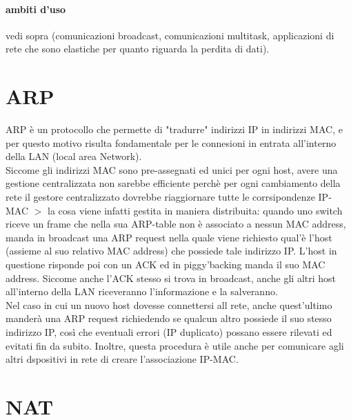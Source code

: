 \documentclass{article}
\begin{document}
\paragraph{ambiti d'uso} vedi sopra (comunicazioni broadcast, comunicazioni
multitask, applicazioni di rete che sono elastiche per quanto riguarda la
perdita di dati).

\section{ARP}
ARP è un protocollo che permette di "tradurre" indirizzi IP in indirizzi MAC, e
per questo motivo risulta fondamentale per le connesioni in entrata all'interno
della LAN (local area Network).\\
Siccome gli indirizzi MAC sono pre-assegnati ed unici per ogni host, avere una
gestione centralizzata non sarebbe efficiente perchè per ogni cambiamento della
rete il gestore centralizzato dovrebbe riaggiornare tutte le corrsipondenze
IP-MAC $>$ la cosa viene infatti gestita in maniera distribuita: quando uno
switch riceve un frame che nella sua ARP-table non è associato a nessun MAC
address, manda in broadcast una ARP request nella quale viene richiesto qual'è
l'host (assieme al suo relativo MAC address) che possiede tale indirizzo IP.
L'host in questione risponde poi con un ACK ed in piggy'backing manda il suo MAC
address. Siccome anche l'ACK stesso si trova in broadcast, anche gli altri host
all'interno della LAN riceveranno l'informazione e la salveranno.\\
Nel caso in cui un nuovo host dovesse connettersi all rete, anche quest'ultimo
manderà una ARP request richiedendo se qualcun altro possiede il suo stesso
indirizzo IP, così che eventuali errori (IP duplicato) possano essere rilevati
ed evitati fin da subito. Inoltre, questa procedura è utile anche per comunicare
agli altri dspositivi in rete di creare l'associazione IP-MAC.

\section{NAT}
\end{document}
